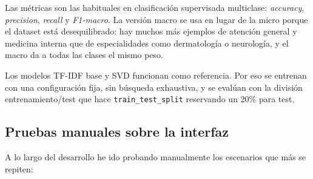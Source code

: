 Las métricas son las habituales en clasificación supervisada multiclase: \textit{accuracy}, \textit{precision}, \textit{recall} y \textit{F1-macro}. La versión macro se usa en lugar de la micro porque el dataset está desequilibrado: hay muchos más ejemplos de atención general y medicina interna que de especialidades como dermatología o neurología, y el macro da a todas las clases el mismo peso.

Los modelos TF-IDF base y SVD funcionan como referencia. Por eso se entrenan con una configuración fija, sin búsqueda exhaustiva, y se evalúan con la división entrenamiento/test que hace \texttt{train\_test\_split} reservando un 20\% para test.

\subsection{Pruebas manuales sobre la interfaz}

A lo largo del desarrollo he ido probando manualmente los escenarios que más se repiten:

